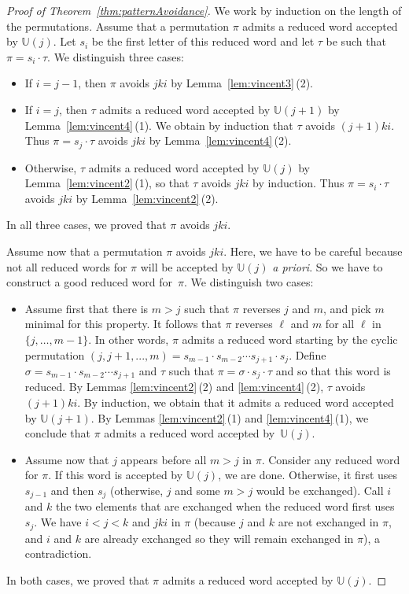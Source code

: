 \documentclass[11pt]{article}
\theoremstyle{definition}
\numberwithin{equation}{section}
\newcommand{\apriori}{\textit{a priori}}
\newcommand{\automatonU}{\mathbb{U}}
\begin{document}
\begin{proof}[Proof of Theorem~\ref{thm:patternAvoidance}]
We work by induction on the length of the permutations.
Assume that a permutation $\pi$ admits a reduced word accepted by $\automatonU(j)$. Let $s_i$ be the first letter of this reduced word and let $\tau$ be such that $\pi = s_i \cdot \tau$. We distinguish three cases:\begin{itemize}
	\item If $i = j-1$, then $\pi$ avoids $jki$ by Lemma~\ref{lem:vincent3}\,(2).
	\item If $i = j$, then $\tau$ admits a reduced word accepted by $\automatonU(j+1)$ by Lemma~\ref{lem:vincent4}\,(1). We obtain by induction that $\tau$ avoids $(j+1)ki$. Thus $\pi = s_j \cdot \tau$ avoids $jki$ by Lemma~\ref{lem:vincent4}\,(2).
	\item Otherwise, $\tau$ admits a reduced word accepted by $\automatonU(j)$ by Lemma~\ref{lem:vincent2}\,(1), so that $\tau$ avoids $jki$ by induction. Thus $\pi = s_i \cdot \tau$ avoids $jki$ by Lemma~\ref{lem:vincent2}\,(2).
\end{itemize}
In all three cases, we proved that $\pi$ avoids $jki$.

Assume now that a permutation $\pi$ avoids $jki$. Here, we have to be careful because not all reduced words for $\pi$ will be accepted by $\automatonU(j)$ \apriori. So we have to construct a good reduced word for~$\pi$. We distinguish two cases:
\begin{itemize}
	\item Assume first that there is $m > j$ such that $\pi$ reverses $j$ and $m$, and pick $m$ minimal for this property. It follows that $\pi$ reverses $\ell$ and $m$ for all $\ell$ in $\{j,\dots,m-1\}$. In other words, $\pi$ admits a reduced word starting by the cyclic permutation $(j, j+1, ..., m) = s_{m-1} \cdot s_{m-2} \cdots s_{j+1} \cdot s_j$. Define ${\sigma = s_{m-1} \cdot s_{m-2}\cdots s_{j+1}}$ and $\tau$ such that $\pi = \sigma \cdot s_j \cdot \tau$ and so that this word is reduced. By Lemmas \ref{lem:vincent2}\,(2) and \ref{lem:vincent4}\,(2), $\tau$ avoids $(j+1)ki$. By induction, we obtain that it admits a reduced word accepted by $\automatonU(j+1)$. By Lemmas \ref{lem:vincent2}\,(1) and \ref{lem:vincent4}\,(1), we conclude that $\pi$ admits a reduced word accepted by~$\automatonU(j)$.
	\item Assume now that $j$ appears before all $m > j$ in $\pi$. Consider any reduced word for $\pi$. If this word is accepted by $\automatonU(j)$, we are done. Otherwise, it first uses $s_{j-1}$ and then $s_j$ (otherwise, $j$ and some $m > j$ would be exchanged). Call $i$ and $k$ the two elements that are exchanged when the reduced word first uses $s_j$. We have $i < j < k$ and $jki$ in $\pi$ (because $j$ and $k$ are not exchanged in $\pi$, and $i$ and $k$ are already exchanged so they will remain exchanged in $\pi$), a contradiction.
\end{itemize}
In both cases, we proved that $\pi$ admits a reduced word accepted by $\automatonU(j)$.
\end{proof}
\end{document}
